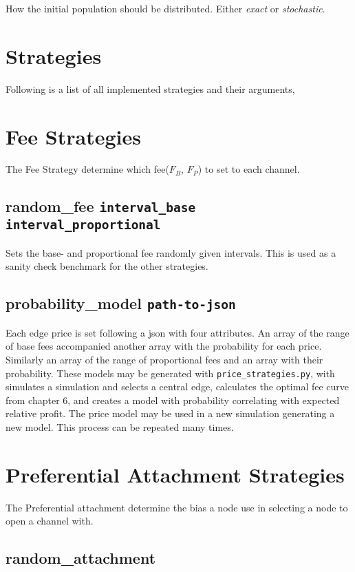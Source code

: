 How the initial population should be distributed. Either \textit{exact} or \textit{stochastic}.

\section{Strategies}

Following is a list of all implemented strategies and their arguments, 

\section*{Fee Strategies}

The Fee Strategy determine which fee($F_B$, $F_P$) to set to each channel.

\subsection*{random\_fee \texttt{interval\_base} \texttt{interval\_proportional}}

Sets the base- and proportional fee randomly given intervals. This is used as a sanity check benchmark for the other strategies.

\subsection*{probability\_model \texttt{path-to-json}}

Each edge price is set following a json with four attributes. An array of the range of base fees accompanied another array with the probability for each price. Similarly an array of the range of proportional fees and an array with their probability. These models may be generated with \texttt{price\_strategies.py}, with simulates a simulation and selects a central edge, calculates the optimal fee curve from chapter 6, and creates a model with probability correlating with expected relative profit. The price model may be used in a new simulation generating a new model. This process can be repeated many times.  

\section*{Preferential Attachment Strategies}

The Preferential attachment determine the bias a node use in selecting a node to open a channel with.

\subsection*{random\_attachment}

